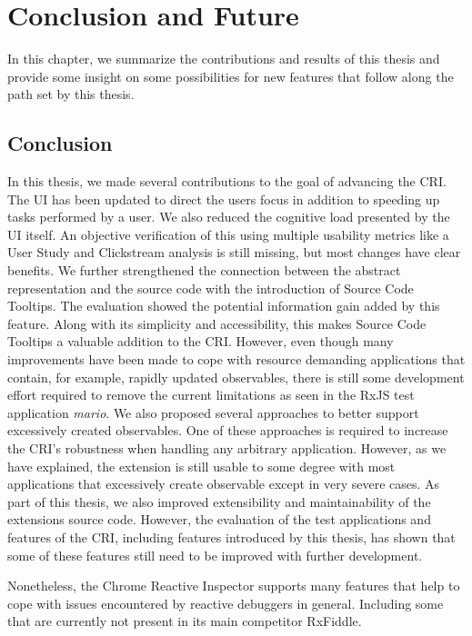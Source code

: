 \chapter{Conclusion and Future}
\label{ch:Future}
In this chapter, we summarize the contributions and results of this thesis and provide some insight on some possibilities for new features that follow along the path set by this thesis. 

\section{Conclusion}
In this thesis, we made several contributions to the goal of advancing the CRI. The UI has been updated to direct the users focus in addition to speeding up tasks performed by a user. We also reduced the cognitive load presented by the UI itself. An objective verification of this using multiple usability metrics like a User Study and Clickstream analysis is still missing, but most changes have clear benefits. We further strengthened the connection between the abstract representation and the source code with the introduction of Source Code Tooltips. The evaluation showed the potential information gain added by this feature. Along with its simplicity and accessibility, this makes Source Code Tooltips a valuable addition to the CRI.
However, even though many improvements have been made to cope with resource demanding applications that contain, for example, rapidly updated observables, there is still some development effort required to remove the current limitations as seen in the RxJS test application \emph{mario}. We also proposed several approaches to better support excessively created observables.
One of these approaches is required to increase the CRI's robustness when handling any arbitrary application. However, as we have explained, the extension is still usable to some degree with most applications that excessively create observable except in very severe cases.
As part of this thesis, we also improved extensibility and maintainability of the extensions source code. However, the evaluation of the test applications and features of the CRI, including features introduced by this thesis, has shown that some of these features still need to be improved with further development.

Nonetheless, the Chrome Reactive Inspector supports many features that help to cope with issues encountered by reactive debuggers in general. Including some that are currently not present in its main competitor RxFiddle.

